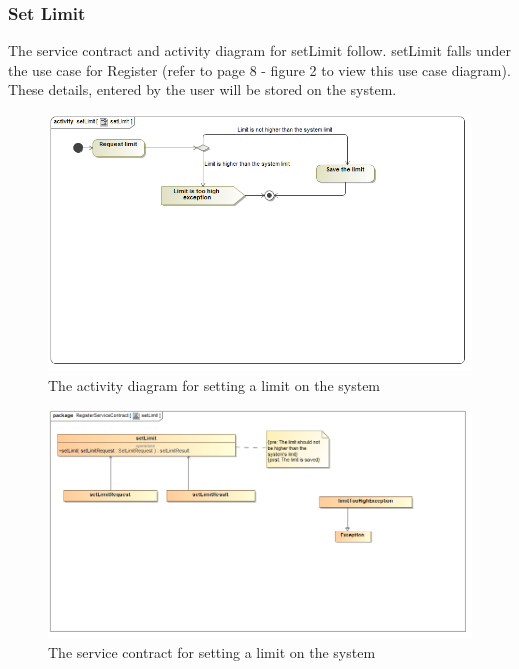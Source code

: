 \documentclass[a4paper,12pt]{report}
\begin{document}
\subsubsection{Set Limit}
The service contract and activity diagram for setLimit follow. setLimit falls under the use case for Register (refer to page 8 - figure 2 to view this use case diagram). These details, entered by the user will be stored on the system. 
\begin{figure}[H]
  \centering
    \includegraphics[width=1.0\textwidth]{../Diagrams/Register/ActivityDiagrams/setLimit.png}
    \caption{The activity diagram for setting a limit on the system} 
\end{figure}
\begin{figure}[H]
  \centering
    \includegraphics[width=1.0\textwidth]{../Diagrams/Register/ServiceContractsRegister/setLimit.png}
    \caption{The service contract for setting a limit on the system} 
\end{figure}
\end{document}
